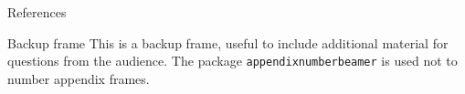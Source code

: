 \documentclass{beamer}
\begin{document}
 
    \makethanks
    \appendix
    \begin{frame}{References}
        \nocite{*}
        
    \end{frame}
    
    \begin{frame}{Backup frame}
        This is a backup frame, useful to include additional material for questions from the audience.
        \vfill
        The package \texttt{appendixnumberbeamer} is used not to number appendix frames.
    \end{frame}
\end{document}
